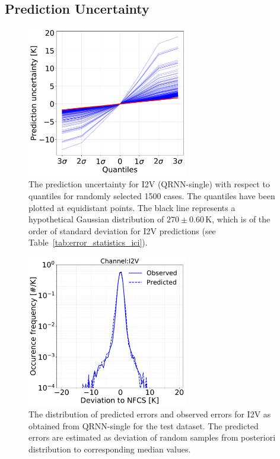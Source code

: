 \documentclass[amt, manuscript]{copernicus}
\begin{document}
\subsection{Prediction Uncertainty}
\label{sec:prediction_uncertainty}
\begin{figure}[t]
	\includegraphics[width = 70mm]{Figures/prediction_uncertainty_I2V.pdf}	
	\caption{The prediction uncertainty for I2V (QRNN-single) with respect to quantiles for randomly selected 1500 cases. The quantiles have been plotted at equidistant points. The black line represents a hypothetical Gaussian distribution of $270\pm0.60$\,K, which is of the order of standard deviation for I2V predictions (see Table~\ref{tab:error_statistics_ici}).}
	\label{fig:prediction_uncertainty_I2V}	
\end{figure}
\begin{figure}[t]
	\includegraphics[width=70mm]{Figures/deviation_posterior_samples_I2V.pdf}	
	\caption{The distribution of predicted errors and observed errors for I2V as obtained from QRNN-single for the test dataset. The predicted errors are estimated as deviation of random samples from posteriori distribution to corresponding median values.}
	\label{fig:predicted_errors}	
\end{figure}
\end{document}
